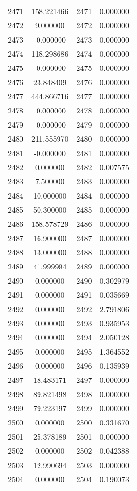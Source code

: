 \documentclass[12pt]{article}
\begin{document}
\begin{longtable}{@{}cccc@{}}
2471 & 158.221466 & 2471 & 0.000000 \\
2472 & 9.000000 & 2472 & 0.000000 \\
2473 & -0.000000 & 2473 & 0.000000 \\
2474 & 118.298686 & 2474 & 0.000000 \\
2475 & -0.000000 & 2475 & 0.000000 \\
2476 & 23.848409 & 2476 & 0.000000 \\
2477 & 444.866716 & 2477 & 0.000000 \\
2478 & -0.000000 & 2478 & 0.000000 \\
2479 & -0.000000 & 2479 & 0.000000 \\
2480 & 211.555970 & 2480 & 0.000000 \\
2481 & -0.000000 & 2481 & 0.000000 \\
2482 & 0.000000 & 2482 & 0.007575 \\
2483 & 7.500000 & 2483 & 0.000000 \\
2484 & 10.000000 & 2484 & 0.000000 \\
2485 & 50.300000 & 2485 & 0.000000 \\
2486 & 158.578729 & 2486 & 0.000000 \\
2487 & 16.900000 & 2487 & 0.000000 \\
2488 & 13.000000 & 2488 & 0.000000 \\
2489 & 41.999994 & 2489 & 0.000000 \\
2490 & 0.000000 & 2490 & 0.302979 \\
2491 & 0.000000 & 2491 & 0.035669 \\
2492 & 0.000000 & 2492 & 2.791806 \\
2493 & 0.000000 & 2493 & 0.935953 \\
2494 & 0.000000 & 2494 & 2.050128 \\
2495 & 0.000000 & 2495 & 1.364552 \\
2496 & 0.000000 & 2496 & 0.135939 \\
2497 & 18.483171 & 2497 & 0.000000 \\
2498 & 89.821498 & 2498 & 0.000000 \\
2499 & 79.223197 & 2499 & 0.000000 \\
2500 & 0.000000 & 2500 & 0.331670 \\
2501 & 25.378189 & 2501 & 0.000000 \\
2502 & 0.000000 & 2502 & 0.042388 \\
2503 & 12.990694 & 2503 & 0.000000 \\
2504 & 0.000000 & 2504 & 0.190073 \\

\end{longtable}
\end{document}

